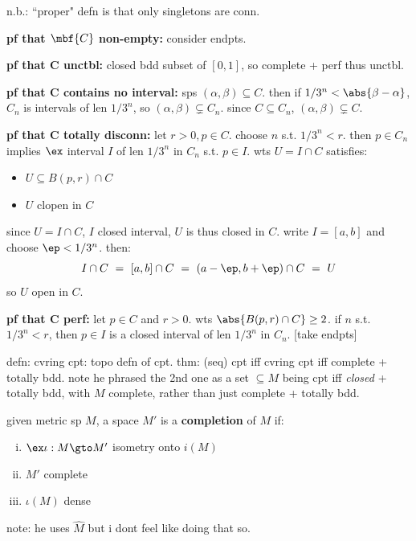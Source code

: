 n.b.: ``proper" defn is that only singletons are conn.

\textbf{pf that $\mbf{C}$ non-empty:} consider endpts.

\textbf{pf that $\bm{C}$ unctbl:}
closed bdd subset of $[0,1]$, so complete + perf thus unctbl.

\textbf{pf that $\bm{C}$ contains no interval:}
sps $(\alpha,\beta)\subseteq C$.
then if $1/3^{n}<\abs{\beta-\alpha}$, $C_{n}$ is intervals of len $1/3^{n}$,
so $(\alpha,\beta)\subsetneq C_{n}$.
since $C\subseteq C_{n}$, $(\alpha,\beta)\subsetneq C$.

\textbf{pf that $\bm{C}$ totally disconn:}
let $r>0,p\in C$. choose $n$ s.t. $1/3^{n}<r$.
then $p\in C_{n}$ implies $\ex$ interval $I$ of len $1/3^{n}$ in $C_{n}$
s.t. $p\in I$. wts $U=I\cap C$ satisfies:
\begin{itemize}
    \item $U\subseteq B(p,r)\cap C$
	\item $U$ clopen in $C$
\end{itemize}
since $U=I\cap C$, $I$ closed interval, $U$ is thus closed in $C$.
write $I=[a,b]$ and choose $\ep<1/3^{n}$. then:
\begin{equation*}
	I\cap C \ = \ [a,b]\cap C \ = \ (a-\ep,b+\ep)\cap C \ = \ U
\end{equation*}
so $U$ open in $C$.

\textbf{pf that $\bm{C}$ perf:}
let $p\in C$ and $r>0$. wts $\abs{B(p,r)\cap C}\geq2$.
if $n$ s.t. $1/3^{n}<r$, then $p\in I$ is a closed interval of len $1/3^{n}$
in $C_{n}$.
[take endpts]



defn: cvring cpt: topo defn of cpt.
thm: (seq) cpt iff cvring cpt iff complete + totally bdd.
note he phrased the 2nd one as a set $\subseteq M$ being cpt iff \textit{closed} + totally bdd,
with $M$ complete, rather than just complete + totally bdd.

\begin{defn}
    given metric sp $M$, a space $M'$ is a \textbf{completion} of $M$ if:
	\begin{enumerate}[i)]
		\item $\ex\iota:M\gto M'$ isometry onto $i(M)$
		\item $M'$ complete
		\item $\iota(M)$ dense
	\end{enumerate}
\end{defn}
note: he uses $\hat{M}$ but i dont feel like doing that so.

